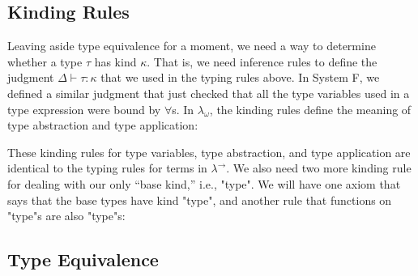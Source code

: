 \subsection{Kinding Rules}

Leaving aside type equivalence for a moment, we need a way to determine
whether a type $\tau$ has kind $\kappa$.
That is, we need inference rules to define the judgment $\Delta \vdash \tau :
\kappa$ that we used in the typing rules above.
In System F, we defined a similar judgment that just checked that all the type
variables used in a type expression were bound by $\forall$s.
In $\lambda_\omega$, the kinding rules define the meaning of type abstraction
and type application:
%
%
These kinding rules for type variables, type abstraction, and type application
are identical to the typing rules for terms in $\lambda^\to$.
We also need two more kinding rule for dealing with our only ``base kind,''
i.e., "type".
We will have one axiom that says that the base types have kind "type", and
another rule that functions on "type"s are also "type"s:
%


\subsection{Type Equivalence}

